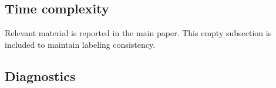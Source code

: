 \documentclass[aoas,preprint]{imsart}
\newtheorem{theorem}{Theorem}
\begin{document}




\subsection{Time complexity}

Relevant material is reported in the  main paper. This empty subsection is included to maintain labeling consistency.

\subsection{Diagnostics}
\end{document}
